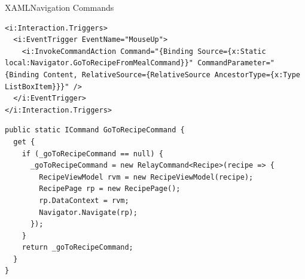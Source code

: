 \begin{frame}[fragile]{XAML}{Navigation Commands}
\begin{lstlisting}
<i:Interaction.Triggers>
  <i:EventTrigger EventName="MouseUp">
    <i:InvokeCommandAction Command="{Binding Source={x:Static local:Navigator.GoToRecipeFromMealCommand}}" CommandParameter="{Binding Content, RelativeSource={RelativeSource AncestorType={x:Type ListBoxItem}}}" />
  </i:EventTrigger>
</i:Interaction.Triggers>
\end{lstlisting}

\begin{lstlisting}
public static ICommand GoToRecipeCommand {
  get {
    if (_goToRecipeCommand == null) {
      _goToRecipeCommand = new RelayCommand<Recipe>(recipe => {
        RecipeViewModel rvm = new RecipeViewModel(recipe);
        RecipePage rp = new RecipePage();
        rp.DataContext = rvm;
        Navigator.Navigate(rp);
      });
    }
    return _goToRecipeCommand;
  }
}
\end{lstlisting}
\end{frame}
